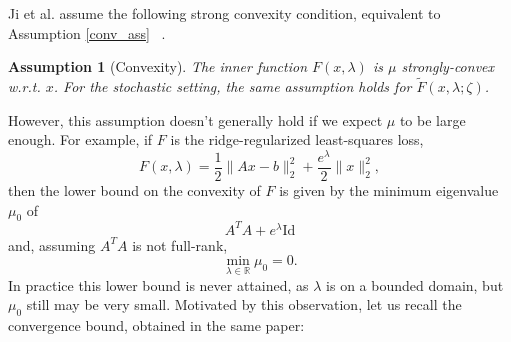 \documentclass[11pt, twoside]{report}
\newtheorem{assumption}[theorem]{Assumption}
\begin{document}
Ji et al. assume the following strong convexity condition, equivalent to Assumption \ref{conv_ass} ~\cite{ji2021bilevel}.

\begin{assumption}[Convexity]
    The inner function $F(x, \lambda)$ is $\mu$ strongly-convex w.r.t. $x$. For the stochastic setting, the same assumption holds for $\tilde{F}(x, \lambda ; \zeta)$.
\end{assumption}

However, this assumption doesn't generally hold if we expect $\mu$ to be large enough. For example, if $F$ is the ridge-regularized least-squares loss,
\[F(x,\lambda) = \frac{1}{2}\|Ax-b\|_2^2 + \frac{e^\lambda}{2}\|x\|_2^2,\]
then the lower bound on the convexity of $F$ is given by the minimum eigenvalue $\mu_0$ of
\[A^T A + e^\lambda \mathrm{Id}\]
and, assuming $A^T A$ is not full-rank,
\[\min_{\lambda \in \mathbb{R}} \mu_0 = 0.\]
In practice this lower bound is never attained, as $\lambda$ is on a bounded domain, but $\mu_0$ still may be very small. Motivated by this observation, let us recall the convergence bound, obtained in the same paper:
\end{document}
